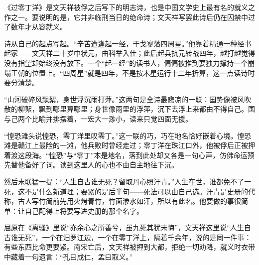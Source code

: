 \begin{appreciation}
《过零丁洋》是文天祥被俘之后写下的明志诗，也是中国文学史上最有名的就义之作之一。要说明的是，它并非临刑当日的绝命诗；文天祥写罢此诗后仍在囚禁中过了数年才从容就义。

诗从自己的起点写起。“辛苦遭逢起一经，干戈寥落四周星。”他靠着精通一种经书起家——文天祥二十岁中状元，由科举入仕；此后起兵抗元转战四年，越打越觉得没有指望却始终没有放下。一个“起一经”的读书人，偏偏被推到要独力撑持一个崩塌王朝的位置上。“四周星”就是四年，不是按木星运行十二年折算，这一点读诗时要分清楚。

“山河破碎风飘絮，身世浮沉雨打萍。”这两句是全诗最悲凉的一联：国势像被风吹散的柳絮，飘到哪里算哪里；身世像雨里的浮萍，沉下去浮上来都由不得自己。国与己两个比喻并排摆着，一宏大一渺小，读来只觉四面无援。

“惶恐滩头说惶恐，零丁洋里叹零丁。”这一联的巧，巧在地名恰好嵌着心境。惶恐滩是赣江上最险的一滩，他兵败时曾经走过；零丁洋在珠江口外，他被俘后正被押着渡这段海。“惶恐”与“零丁”本是地名，落到此处却又各是一句心声，仿佛命运预先替他备好了词。读到这里人的心也不由自主地往下沉。

然后末联猛一提：“人生自古谁无死？留取丹心照汗青。”人生在世，谁都免不了一死，这不是什么新道理；要紧的是后半句——死法可以由自己选。汗青是史册的代称，古人写竹简前先用火烤青竹，竹面渗水如汗，所以有此名。他要做的事很简单：让自己配得上将要写进史册的那个名字。

屈原在《离骚》里说“亦余心之所善兮，虽九死其犹未悔”，文天祥这里说“人生自古谁无死”，一个在汨罗江边，一个在零丁洋上，隔着千余年，说的是同一件事：有些东西比命更要紧。南宋亡后，文天祥被押到大都，拒绝一切劝降，就义时衣带中藏着一句遗言：“孔曰成仁，孟曰取义。”
\end{appreciation}
